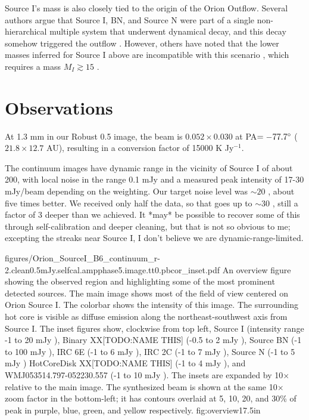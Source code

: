 \documentclass[twocolumn]{aastex61}
\begin{document}
Source I's mass is also closely tied to the origin of the Orion Outflow.
Several authors argue that Source I, BN, and Source N \citep[or, alternatively,
source X][]{Luhman2017a} were part of a single non-hierarchical multiple system
that underwent dynamical decay, and this decay somehow triggered the outflow
\citep{Bally2005a,Rodriguez2005a,Goddi2010a,Bally2011a,Bally2015a,Bally2017a}.  However, others have
noted that the lower masses inferred for Source I above are incompatible with
this scenario \citep{Chatterjee2012a,Farias2017a,Plambeck2016a}, which requires
a mass $M_{I} \gtrsim 15$ \msun.

\section{Observations}

At 1.3 mm in our Robust 0.5 image, the beam is $0.052\times0.030$ \arcsec at
PA$=-77.7^{\circ}$ ($21.8\times12.7$ AU), resulting in a 
conversion factor of 15000 K Jy$^{-1}$.


The continuum images have dynamic range in the vicinity of Source I of about 200,
with local noise in the range 0.1 mJy \perbeam and a measured peak intensity of 17-30
mJy/beam depending on the weighting.
{\color{red} Our target noise level was $\sim20$ \microJy \perbeam,
about five times better.  We received only half the data, so that goes up to $\sim30$
\microJy \perbeam, still a factor of 3 deeper than we achieved.  It *may* be possible
to recover some of this through self-calibration and deeper cleaning, but that
is not so obvious to me; excepting the streaks near Source I, I don't believe
we are dynamic-range-limited.}

\Figure
{figures/Orion_SourceI_B6_continuum_r-2.clean0.5mJy.selfcal.ampphase5.image.tt0.pbcor_inset.pdf}
{An overview figure showing the observed region and highlighting some of
the most prominent detected sources.
The main image shows most of the field of view centered on Orion Source I.
The colorbar shows the intensity of this image.
The surrounding hot core is visible as diffuse emission along the northeast-southwest
axis from Source I.
The inset figures show, clockwise from top left, 
Source I (intensity range -1 to 20 mJy \perbeam),
Binary XX[TODO:NAME THIS] (-0.5 to 2 mJy \perbeam),
Source BN (-1 to 100 mJy \perbeam),
IRC 6E (-1 to 6 mJy \perbeam),
IRC 2C (-1 to 7 mJy \perbeam),
Source N (-1 to 5 mJy \perbeam)
HotCoreDisk XX[TODO:NAME THIS] (-1 to 4 mJy \perbeam),
and
WMJ053514.797-052230.557 (-1 to 10 mJy \perbeam).
The insets are expanded by 10$\times$ relative to the main image.
The synthesized beam is shown at the same 10$\times$ zoom factor in the
bottom-left; it has contours overlaid at 5, 10, 20, and 30\% of peak
in purple, blue, green, and yellow respectively.
}
{fig:overview}{1}{7.5in}
\end{document}

